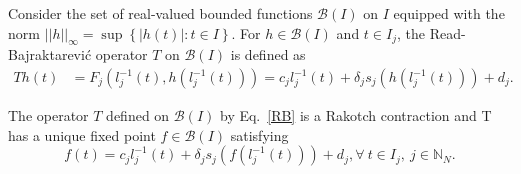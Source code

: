 \documentclass[sn-mathphys-num]{sn-jnl}
\numberwithin{equation}{section}
\begin{document}
Consider the set of real-valued bounded functions $\mathcal{B}(I)$ on $I$ equipped with the norm $||h||_{\infty}=\sup\left\{|h(t)|:t\in I\right\}.$
For $h \in\mathcal{B}(I)$ and $t \in I_j$, the Read-Bajraktarević operator $T$ on $\mathcal{B}(I)$ is defined as 
\begin{eqnarray}
Th(t)&=F_j(l_j^{-1}(t),h(l_j^{-1}(t))) = c_jl_j^{-1}(t)+\delta_js_j(h(l_j^{-1}(t)))+d_j\label{RB}.
\end{eqnarray}
\begin{theorem}\label{Rbfpthm}
The operator $T$ defined on $\mathcal{B}(I)$ by Eq.~\eqref{RB} is a Rakotch contraction and T has a unique fixed point $f\in\mathcal{B}(I)$ satisfying
\begin{equation}\label{fp}
f(t)=c_jl_j^{-1}(t)+\delta_js_j(f(l_j^{-1}(t)))+d_j, \forall \ t\in I_j,~ j\in \mathbb{N}_N.
\end{equation}
\end{theorem}
\end{document}
